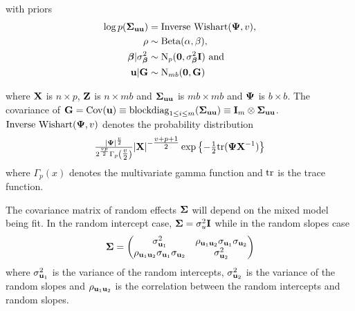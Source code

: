 \noindent with priors
\begin{align*}
	\log{p({\boldsymbol\Sigma}_{{\bf u}{\bf u}})} & = \text{Inverse Wishart}({\boldsymbol \Psi}, v),    \\
	\rho                       & \sim \text{Beta}(\alpha, \beta),             \\
	{\boldsymbol \beta}|\sigma^2_{\boldsymbol \beta}     & \sim \text{N}_p({\bf 0}, \sigma^2_{\boldsymbol \beta} {\bf I}) \text{ and } \\
	{\bf u}|{\bf G}       & \sim \text{N}_{mb}({\bf 0}, {\bf G})              
\end{align*}

\noindent where ${\bf X}$ is $n \times p$, ${\bf Z}$ is $n \times mb$ and ${\boldsymbol \Sigma}_{{\bf u}
{\bf u}}$ is $mb \times mb$ and ${\boldsymbol \Psi}$ is $b \times b$. The covariance of ${\bf G} =
\mbox{Cov}({\bf u}) \equiv \text{blockdiag}_{1 \leq i \leq m} ({\boldsymbol \Sigma}_{{\bf u} {\bf u}}) \equiv {\bf I}_m
\otimes {\boldsymbol\Sigma}_{{\bf u} {\bf u}}$. $\text{Inverse Wishart}({\boldsymbol \Psi}, v)$ denotes the
probability distribution
\begin{equation*}
\tfrac{|{\boldsymbol \Psi}|^\frac{v}{2}}{2^{\frac{vp}{2}}
\Gamma_p{\left(\tfrac{v}{2}\right)}} |{\bf X}|^{-\tfrac{v + p + 1}{2}}
\exp{\left\{-\tfrac{1}{2} \text{tr}{({\boldsymbol\Psi}{\bf X}^{-1})}\right\}}
\end{equation*}
where $\Gamma_p{(x)}$ denotes the multivariate gamma function and $\text{tr}$ is the
trace function.

The covariance matrix of random effects ${\boldsymbol \Sigma}$ will depend on the mixed
model being fit. In the random intercept case, ${\boldsymbol \Sigma} = \sigma_u^2 {\bf I}$ while
in the random slopes case
\[
	{\boldsymbol \Sigma} = 
	\begin{pmatrix}
		\sigma_{{\bf u}_1}^2                                 & \rho_{{\bf u}_1 {\bf u}_2} \sigma_{{\bf u}_1} \sigma_{{\bf u}_2} \\
		\rho_{{\bf u}_1 {\bf u}_2} \sigma_{{\bf u}_1} \sigma_{{\bf u}_2} & \sigma_{{\bf u}_2}^2                                 
	\end{pmatrix}
\]
where $\sigma_{{\bf u}_1}^2$ is the variance of the random intercepts,
$\sigma_{{\bf u}_2}^2$ is the variance of the random slopes and $\rho_{{\bf u}_1
{\bf u}_2}$ is the correlation between the random intercepts and random slopes.


